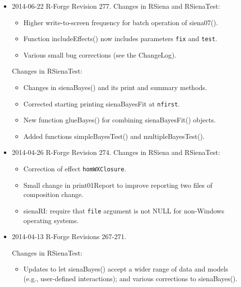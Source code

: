 \documentclass[a4paper,fleqn,11pt]{article}
\newcommand{\+}{\, + \,}
\newcommand{\sfn}[1]{\textsf{#1}}
\begin{document}
{\begin{small}
\begin{itemize}
\item 2014-06-22 R-Forge Revision 277.
Changes in RSiena and RSienaTest:
\begin{itemize}
\item Higher write-to-screen frequency for batch operation of \sfn{siena07()}.
\item Function \sfn{includeEffects()} now includes parameters \texttt{fix} and \texttt{test}.
\item Various small bug corrections (see the \sfn{ChangeLog}).
\end{itemize}

Changes in RSienaTest:
\begin{itemize}
\item Changes in \sfn{sienaBayes()} and its print and summary methods.
\item Corrected starting printing \sfn{sienaBayesFit} at \texttt{nfirst}.
\item New function \sfn{glueBayes()} for combining \sfn{sienaBayesFit()} objects.
\item Added functions \sfn{simpleBayesTest()} and \sfn{multipleBayesTest()}.
\end{itemize}

\item 2014-04-26 R-Forge Revision 274.
Changes in RSiena and RSienaTest:
\begin{itemize}
\item Correction of effect \texttt{homWXClosure}.
\item Small change in \sfn{print01Report} to improve reporting
     two files of composition change.
\item \sfn{sienaRI}: require that \texttt{file} argument is not NULL for non-Windows
     operating systems.
\end{itemize}

\item 2014-04-13 R-Forge Revisions 267-271.

Changes in RSienaTest:
\begin{itemize}
 \item Updates to let \sfn{sienaBayes()} accept
     a wider range of data and models (e.g., user-defined interactions);
     and various corrections to \sfn{sienaBayes()}.
\end{itemize}


\end{itemize}
\end{small}}
\end{document}
